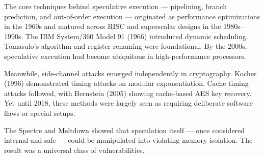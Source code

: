 \begin{historical}
The core techniques behind speculative execution — pipelining, branch prediction, and out-of-order execution — originated as performance optimizations in the 1960s and matured across RISC and superscalar designs in the 1980s–1990s. The IBM System/360 Model 91 (1966) introduced dynamic scheduling. Tomasulo's algorithm and register renaming were foundational. By the 2000s, speculative execution had become ubiquitous in high-performance processors.

Meanwhile, side-channel attacks emerged independently in cryptography. Kocher (1996) demonstrated timing attacks on modular exponentiation. Cache timing attacks followed, with Bernstein (2005) showing cache-based AES key recovery. Yet until 2018, these methods were largely seen as requiring deliberate software flaws or special setups.

The Spectre and Meltdown showed that speculation itself — once considered internal and safe — could be manipulated into violating memory isolation. The result was a universal class of vulnerabilities.
\end{historical}
